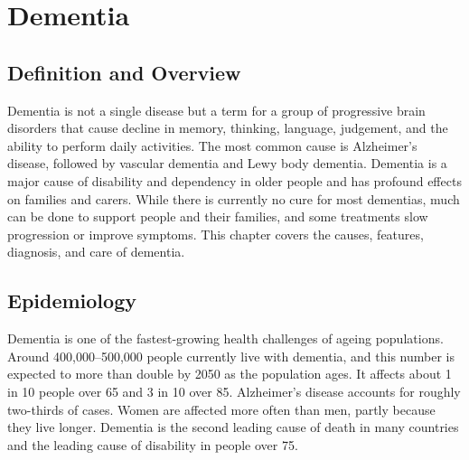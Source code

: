 \chapter{Dementia}

\section*{Definition and Overview}
Dementia is not a single disease but a term for a group of progressive brain disorders that cause decline in memory, thinking, language, judgement, and the ability to perform daily activities. The most common cause is Alzheimer's disease, followed by vascular dementia and Lewy body dementia. Dementia is a major cause of disability and dependency in older people and has profound effects on families and carers. While there is currently no cure for most dementias, much can be done to support people and their families, and some treatments slow progression or improve symptoms. This chapter covers the causes, features, diagnosis, and care of dementia.

\section*{Epidemiology}
Dementia is one of the fastest-growing health challenges of ageing populations. Around 400,000--500,000 people currently live with dementia, and this number is expected to more than double by 2050 as the population ages. It affects about 1 in 10 people over 65 and 3 in 10 over 85. Alzheimer's disease accounts for roughly two-thirds of cases. Women are affected more often than men, partly because they live longer. Dementia is the second leading cause of death in many countries and the leading cause of disability in people over 75.

